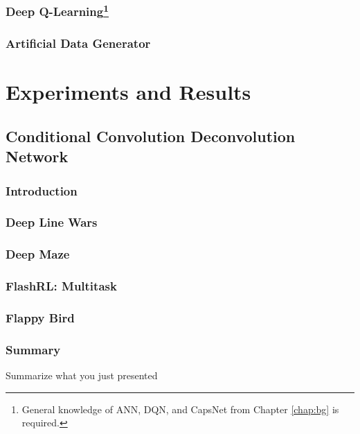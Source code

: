 \documentclass{uia}
\begin{document}
\section[Deep Q-Learning]{Deep Q-Learning\footnote{General knowledge of ANN, DQN, and CapsNet from Chapter \ref{chap:bg} is required.}}
\label{sec:solutions:dqn}

\section{Artificial Data Generator}
\label{sec:solutions:datagen}

\part{Experiments and Results}

\chapter[Conditional Convolution Deconvolution Network]{Conditional Convolution Deconvolution Network}
\label{chap:results:ccdn}

\section{Introduction}
\label{sec:results:datagen:ccdn}

\section{Deep Line Wars}
\label{sec:results:datagen:dlw}

\section{Deep Maze}
\label{sec:results:datagen:ccdn:deepmaze}

\section{FlashRL: Multitask}
\label{sec:results:datagen:ccdn:flashrl}

\section{Flappy Bird}
\label{sec:results:datagen:ccdn:flappybird}

\section{Summary}
Summarize what you just presented
\end{document}
